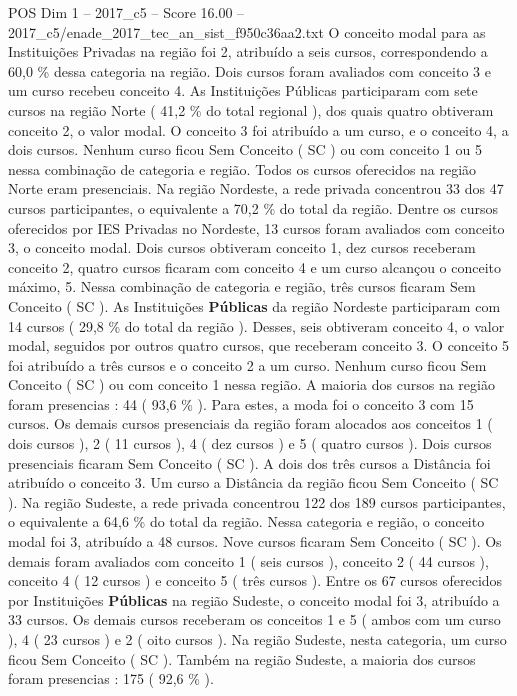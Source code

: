 \begin{textsample}{POS Dim 1 – 2017\_c5 – Score 16.00 – 2017\_c5/enade\_2017\_tec\_an\_sist\_f950c36aa2.txt}
O conceito modal para as Instituições Privadas na região foi 2, atribuído a seis cursos, correspondendo a 60,0 \% dessa categoria na região.
Dois cursos foram avaliados com conceito 3 e um curso recebeu conceito 4.
As Instituições Públicas participaram com sete cursos na região Norte ( 41,2 \% do total regional ), dos quais quatro obtiveram conceito 2, o valor modal.
O conceito 3 foi atribuído a um curso, e o conceito 4, a dois cursos.
Nenhum curso ficou Sem Conceito ( SC ) ou com conceito 1 ou 5 nessa combinação de categoria e região.
Todos os cursos oferecidos na região Norte eram presenciais.
Na região Nordeste, a rede privada concentrou 33 dos 47 cursos participantes, o equivalente a 70,2 \% do total da região.
Dentre os cursos oferecidos por IES Privadas no Nordeste, 13 cursos foram avaliados com conceito 3, o conceito modal.
Dois cursos obtiveram conceito 1, dez cursos receberam conceito 2, quatro cursos ficaram com conceito 4 e um curso alcançou o conceito máximo, 5.
Nessa combinação de categoria e região, três cursos ficaram Sem Conceito ( SC ).
As Instituições \textbf{Públicas} da região Nordeste participaram com 14 cursos ( 29,8 \% do total da região ).
Desses, seis obtiveram conceito 4, o valor modal, seguidos por outros quatro cursos, que receberam conceito 3.
O conceito 5 foi atribuído a três cursos e o conceito 2 a um curso.
Nenhum curso ficou Sem Conceito ( SC ) ou com conceito 1 nessa região.
A maioria dos cursos na região foram presencias : 44 ( 93,6 \% ).
Para estes, a moda foi o conceito 3 com 15 cursos.
Os demais cursos presenciais da região foram alocados aos conceitos 1 ( dois cursos ), 2 ( 11 cursos ), 4 ( dez cursos ) e 5 ( quatro cursos ).
Dois cursos presenciais ficaram Sem Conceito ( SC ).
A dois dos três cursos a Distância foi atribuído o conceito 3.
Um curso a Distância da região ficou Sem Conceito ( SC ).
Na região Sudeste, a rede privada concentrou 122 dos 189 cursos participantes, o equivalente a 64,6 \% do total da região.
Nessa categoria e região, o conceito modal foi 3, atribuído a 48 cursos.
Nove cursos ficaram Sem Conceito ( SC ).
Os demais foram avaliados com conceito 1 ( seis cursos ), conceito 2 ( 44 cursos ), conceito 4 ( 12 cursos ) e conceito 5 ( três cursos ).
Entre os 67 cursos oferecidos por Instituições \textbf{Públicas} na região Sudeste, o conceito modal foi 3, atribuído a 33 cursos.
Os demais cursos receberam os conceitos 1 e 5 ( ambos com um curso ), 4 ( 23 cursos ) e 2 ( oito cursos ).
Na região Sudeste, nesta categoria, um curso ficou Sem Conceito ( SC ).
Também na região Sudeste, a maioria dos cursos foram presencias : 175 ( 92,6 \% ).

\end{textsample}
